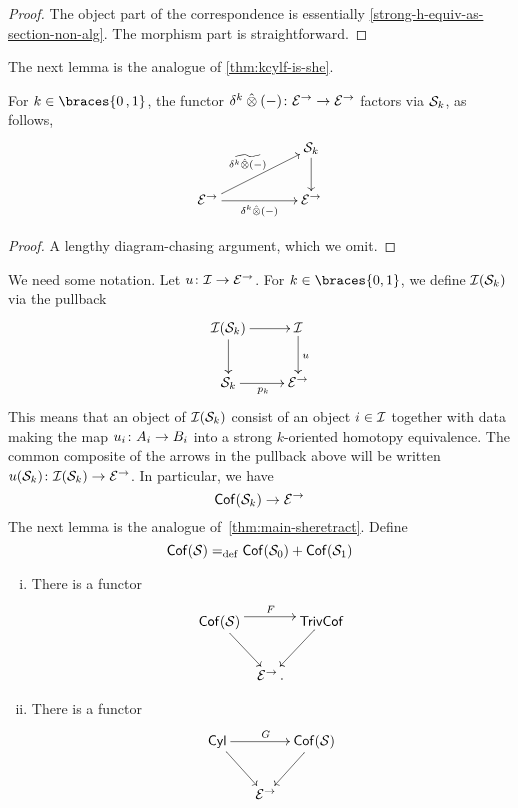 \documentclass[reqno,10pt,a4paper,oneside,draft]{amsart}
\begin{document}
{{\begin{proof} The object part of the correspondence is essentially \cref{strong-h-equiv-as-section-non-alg}. The morphism part is
straightforward. 
\end{proof}

The next lemma is the analogue of \cref{thm:kcylf-is-she}. 

\begin{lemma} \label{thm:kcylf-is-she-alg} For $k \in \braces{ 0 \, , 1}$, the functor $\kcyl \hatotimes (-) \co \cal{E}^\to \to \cal{E}^\to$ factors via $\cal{S}_k$,
as follows,
\[
\xymatrix@C+3em{
 & \cal{S}_k \ar[d] \\ 
\cal{E}^\to \ar[r]_-{\kcyl \hatotimes (-)}  \ar[ur]^-{\widetilde{\kcyl \hatotimes (-)}\, } & \cal{E}^\to }
\]
\end{lemma} 

\begin{proof} A lengthy diagram-chasing argument, which we omit.
\end{proof} 


We need some notation. Let $u \co \cal{I} \to \cal{E}^\to$. For $k \in \braces{0,1}$, we define $\cal{I}(\cal{S}_k)$ via the pullback
\begin{equation}
\label{rel-strong-h-equiv-def}
\begin{gathered}
\xymatrix{
 \cal{I}(\cal{S}_k) \ar[r] \ar[d] & \cal{I} \ar[d]^u \\
\cal{S}_k \ar[r]_{p_k} & \cal{E}^\to
}
\end{gathered}
\end{equation}
This means that an object of $\cal{I}(\cal{S}_k)$ consist of an object $i \in \cal{I}$ together with data making the map $u_i \co
A_i \to B_i$ into a 
strong $k$-oriented homotopy equivalence. The common composite of the arrows in the pullback above will be written
 $u(\cal{S}_k) \co \cal{I}(\cal{S}_k) \to \cal{E}^\to$. In particular, we have
\[
\Cof ( \cal{S}_k ) \to \cal{E}^\to
\]
The next lemma is the analogue of~\cref{thm:main-sheretract}. Define
\[
\Cof(\cal{S}) \defeq  \Cof(\cal{S}_0) + \Cof(\cal{S}_1)
\]


\begin{proposition} \label{thm:strong-hequiv} \hfill 
\begin{enumerate}[(i)]
\item   \label{thm:onedir} There is a functor
\[
\xymatrix@!C@C-2.5em{
\Cof(\cal{S})
  \ar[dr]
  \ar@<4pt>[rr]^F
&&
  \TrivCof
  \ar[dl]
\\&
  \catE^\to \, .
}
\]
\item  \label{thm:twodir} There is a functor
\[
\xymatrix@!C@C-2.5em{
    \Cyl
  \ar[dr]
  \ar[rr]^G
&&
\Cof(\cal{S})
  \ar[dl]
\\&
  \catE^\to
}
\]
\end{enumerate}
\end{proposition}

}}
\end{document}
